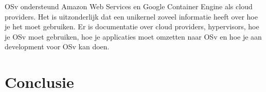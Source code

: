 \documentclass[pdftex,a4paper,12pt,twoside]{report}
\begin{document}
OSv ondersteund Amazon Web Services en Google Container Engine als cloud providers. Het is uitzonderlijk dat een unikernel zoveel informatie heeft over hoe je het moet gebruiken. Er is documentatie over cloud providers, hypervisors, hoe je OSv moet gebruiken, hoe je applicaties moet omzetten naar OSv en hoe je aan development voor OSv kan doen.  

\chapter{Conclusie}
\label{ch:conclusie}







\listoffigures
\listoftables
\end{document}
